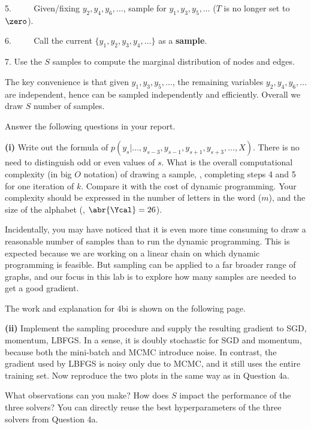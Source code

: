 \documentclass[11pt]{report}
\begin{document}
\begin{itemize}
	5. $\qquad$ Given/fixing $y_2, y_4, y_6, \ldots$, sample for $y_1, y_3, y_5, \ldots$ ($T$ is no longer set to $\zero$).
	
	6. $\qquad$ Call the current $\{y_1, y_2, y_3, y_4, \ldots\}$ as a \textbf{sample}.
	
	7. Use the $S$ samples to compute the marginal distribution of nodes and edges.
	
	The key convenience is that given $y_1, y_3, y_5, \ldots$, 
	the remaining variables $y_2, y_4, y_6, \ldots$ are independent, hence can be sampled independently and efficiently.
	Overall we draw $S$ number of samples.
	
	
	
	
	Answer the following questions in your report.
	
	\textbf{(i)} 
	Write out the formula of $p(y_s|\ldots, y_{s-3}, y_{s-1}, y_{s+1}, y_{s+3}, \ldots, X)$.
	There is no need to distinguish odd or even values of $s$. 
	What is the overall computational complexity (in big $O$ notation) of drawing a sample, \ie, completing steps 4 and 5 for one iteration of $k$.
	Compare it with the cost of dynamic programming.
	Your complexity should be expressed in the number of letters in the word ($m$),
	and the size of the alphabet (\ie, $\abr{\Ycal}=26$).
	
	Incidentally, you may have noticed that it is even more time consuming to draw a reasonable number of samples than to run the dynamic programming.
	This is expected because we are working on a linear chain on which dynamic programming is feasible.
	But sampling can be applied to a far broader range of graphs,
	and our focus in this lab is to explore how many samples are needed to get a good gradient.

	\textcolor{b}{The work and explanation for 4bi is shown on the following page.}
	
	
	\textbf{(ii)} 
	Implement the sampling procedure and supply the resulting gradient to SGD, momentum, LBFGS.
	In a sense, it is doubly stochastic for SGD and momentum, because both the mini-batch and MCMC introduce noise. 
	In contrast, the gradient used by LBFGS is noisy only due to MCMC,
	and it still uses the entire training set.
	Now reproduce the two plots in the same way as in Question 4a.

	
	What observations can you make?  How does $S$ impact the performance of the three solvers?
	You can directly reuse the best hyperparameters of the three solvers from Question 4a.
		

\end{itemize}
\end{document}
